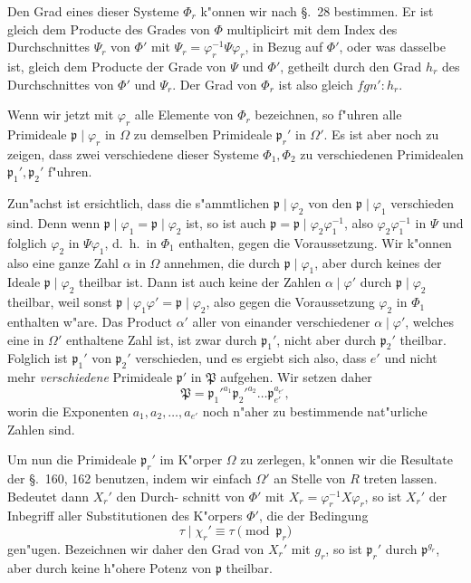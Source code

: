\documentclass[12pt,a4paper]{article}
\theoremstyle{weber}
\begin{document}
Den Grad eines dieser Systeme $\varPhi_r$ k"onnen wir nach \S.~28
bestimmen. Er ist gleich dem Producte des Grades von $\varPhi$
multiplicirt mit dem Index des Durchschnittes $\varPsi_r$ von $\varPhi'$ mit
$\varPsi_r = \varphi_r^{-1}\varPsi\varphi_r$, in Bezug auf $\varPhi'$, oder was dasselbe ist, gleich
dem Producte der Grade von $\varPsi$ und $\varPhi'$, getheilt durch den
Grad $h_r$ des Durchschnittes von $\varPhi'$ und $\varPsi_r$. Der Grad von $\varPhi_r$
ist also gleich $fgn' : h_r$.

Wenn wir jetzt mit $\varphi_r$ alle Elemente von $\varPhi_r$ bezeichnen, so
f"uhren alle Primideale $\mathfrak{p} \mid \varphi_r$ in $\varOmega$ zu demselben Primideale $\mathfrak{p}_r'$
in $\varOmega'$. Es ist aber noch zu zeigen, dass zwei verschiedene dieser
Systeme $\varPhi_1, \varPhi_2$ zu verschiedenen Primidealen $\mathfrak{p}_1', \mathfrak{p}_2'$ f"uhren.

Zun"achst ist ersichtlich, dass die s"ammtlichen $\mathfrak{p} \mid \varphi_2$ von den
$\mathfrak{p} \mid \varphi_1$ verschieden sind. Denn wenn $\mathfrak{p} \mid \varphi_1 = \mathfrak{p} \mid \varphi_2$ ist, so ist
auch $\mathfrak{p} = \mathfrak{p} \mid \varphi_2\varphi_1^{-1}$, also $\varphi_2\varphi_1^{-1}$ in $\varPsi$ und folglich $\varphi_2$ in $\varPsi\varphi_1$,
d.~h.\ in $\varPhi_1$ enthalten, gegen die Voraussetzung. Wir k"onnen
also eine ganze Zahl $\alpha$ in $\varOmega$ annehmen, die durch $\mathfrak{p} \mid \varphi_1$, aber
durch keines der Ideale $\mathfrak{p} \mid \varphi_2$ theilbar ist. Dann ist auch keine
der Zahlen $\alpha \mid \varphi'$ durch $\mathfrak{p} \mid \varphi_2$ theilbar, weil sonst $\mathfrak{p} \mid \varphi_1\varphi' = \mathfrak{p} \mid \varphi_2$,
also gegen die Voraussetzung $\varphi_2$ in $\varPhi_1$ enthalten w"are. Das
Product $\alpha'$ aller von einander verschiedener $\alpha \mid \varphi'$, welches eine
in $\varOmega'$ enthaltene Zahl ist, ist zwar durch $\mathfrak{p}_1'$, nicht aber durch $\mathfrak{p}_2'$
theilbar. Folglich ist $\mathfrak{p}_1'$ von $\mathfrak{p}_2'$ verschieden, und es ergiebt sich
also, dass $e'$ und nicht mehr \emph{verschiedene} Primideale $\mathfrak{p}'$ in
$\mathfrak{P}$ aufgehen. Wir setzen daher
\begin{equation}\label{eq:s163-3}
\mathfrak{P} = \mathfrak{p}_1'^{a_1}\mathfrak{p}_2'^{a_2}\dots\mathfrak{p}_{e'}^{a_{e'}},
\end{equation}
worin die Exponenten $a_1, a_2, \dots, a_{e'}$ noch n"aher zu bestimmende
nat"urliche Zahlen sind.

Um nun die Primideale $\mathfrak{p}_r'$ im K"orper $\varOmega$ zu zerlegen, k"onnen
wir die Resultate der \S.~160, 162 benutzen, indem wir einfach
$\varOmega'$ an Stelle von $R$ treten lassen. Bedeutet dann $X_r'$ den Durch-
schnitt von $\varPhi'$ mit $X_r = \varphi_r^{-1}X\varphi_r$, so ist $X_r'$ der Inbegriff aller
Substitutionen des K"orpers $\varPhi'$, die der Bedingung
\[
\tau \mid \chi_r' \equiv \tau \pmod{\mathfrak{p}_r}
\]
gen"ugen. Bezeichnen wir daher den Grad von $X_r'$ mit $g_r$, so ist
$\mathfrak{p}_r'$ durch $\mathfrak{p}^{g_r}$, aber durch keine h"ohere Potenz von $\mathfrak{p}$ theilbar.
\end{document}
